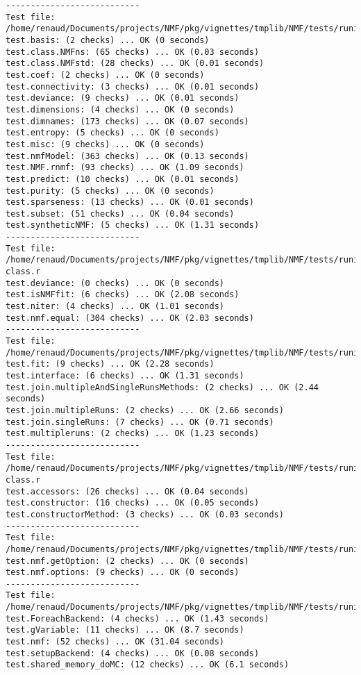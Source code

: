 \documentclass[10pt]{article}
\begin{document}
\begin{verbatim}
--------------------------- 
Test file: /home/renaud/Documents/projects/NMF/pkg/vignettes/tmplib/NMF/tests/runit.NMFclass.r 
test.basis: (2 checks) ... OK (0 seconds)
test.class.NMFns: (65 checks) ... OK (0.03 seconds)
test.class.NMFstd: (28 checks) ... OK (0.01 seconds)
test.coef: (2 checks) ... OK (0 seconds)
test.connectivity: (3 checks) ... OK (0.01 seconds)
test.deviance: (9 checks) ... OK (0.01 seconds)
test.dimensions: (4 checks) ... OK (0 seconds)
test.dimnames: (173 checks) ... OK (0.07 seconds)
test.entropy: (5 checks) ... OK (0 seconds)
test.misc: (9 checks) ... OK (0 seconds)
test.nmfModel: (363 checks) ... OK (0.13 seconds)
test.NMF.rnmf: (93 checks) ... OK (1.09 seconds)
test.predict: (10 checks) ... OK (0.01 seconds)
test.purity: (5 checks) ... OK (0 seconds)
test.sparseness: (13 checks) ... OK (0.01 seconds)
test.subset: (51 checks) ... OK (0.04 seconds)
test.syntheticNMF: (5 checks) ... OK (1.31 seconds)
--------------------------- 
Test file: /home/renaud/Documents/projects/NMF/pkg/vignettes/tmplib/NMF/tests/runit.NMFfit-class.r 
test.deviance: (0 checks) ... OK (0 seconds)
test.isNMFfit: (6 checks) ... OK (2.08 seconds)
test.niter: (4 checks) ... OK (1.01 seconds)
test.nmf.equal: (304 checks) ... OK (2.03 seconds)
--------------------------- 
Test file: /home/renaud/Documents/projects/NMF/pkg/vignettes/tmplib/NMF/tests/runit.NMFSet.r 
test.fit: (9 checks) ... OK (2.28 seconds)
test.interface: (6 checks) ... OK (1.31 seconds)
test.join.multipleAndSingleRunsMethods: (2 checks) ... OK (2.44 seconds)
test.join.multipleRuns: (2 checks) ... OK (2.66 seconds)
test.join.singleRuns: (7 checks) ... OK (0.71 seconds)
test.multipleruns: (2 checks) ... OK (1.23 seconds)
--------------------------- 
Test file: /home/renaud/Documents/projects/NMF/pkg/vignettes/tmplib/NMF/tests/runit.NMFStrategy-class.r 
test.accessors: (26 checks) ... OK (0.04 seconds)
test.constructor: (16 checks) ... OK (0.05 seconds)
test.constructorMethod: (3 checks) ... OK (0.03 seconds)
--------------------------- 
Test file: /home/renaud/Documents/projects/NMF/pkg/vignettes/tmplib/NMF/tests/runit.options.r 
test.nmf.getOption: (2 checks) ... OK (0 seconds)
test.nmf.options: (9 checks) ... OK (0 seconds)
--------------------------- 
Test file: /home/renaud/Documents/projects/NMF/pkg/vignettes/tmplib/NMF/tests/runit.parallel.r 
test.ForeachBackend: (4 checks) ... OK (1.43 seconds)
test.gVariable: (11 checks) ... OK (8.7 seconds)
test.nmf: (52 checks) ... OK (31.04 seconds)
test.setupBackend: (4 checks) ... OK (0.08 seconds)
test.shared_memory_doMC: (12 checks) ... OK (6.1 seconds)

\end{verbatim}
\end{document}
